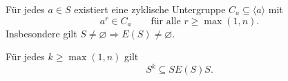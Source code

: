 \begin{theorem}\label{guide:kernelpower}
Für jedes $a\in S$ existiert eine zyklische Untergruppe
$C_a\subseteq\langle a\rangle$ mit
\[
 a^r\in C_a\qquad\text{für alle }r\geq\max(1,n).
\]
Insbesondere gilt $S\ne\varnothing\Rightarrow E(S)\ne\varnothing$.
\cite{projectindex,grillet}
\end{theorem}

\begin{theorem}\label{guide:longproducts}
Für jedes $k\geq\max(1,n)$ gilt
\[
 S^k\subseteq SE(S)S.
\]
\cite[Lemma~2.2]{AlmeidaMargolisSteinbergVolkov2009}
\end{theorem}
